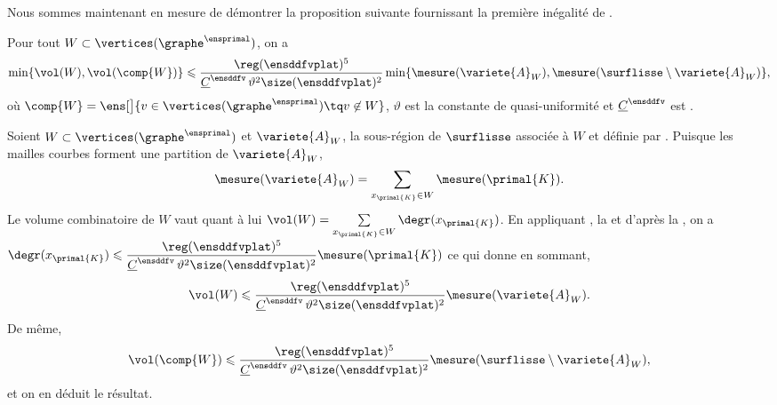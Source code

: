 Nous sommes maintenant en mesure de démontrer la proposition suivante fournissant la première inégalité de .
\begin{prop} \label{prop:inegalites_strategie_un}
Pour tout $W \subset \vertices(\graphe^\ensprimal)$, on a
\[
\min\{ \vol(W), \vol(\comp{W}) \} \leqslant \frac{\reg(\ensddfvplat)^5}{\underline{C}^\ensddfv \, \vartheta^2 \size(\ensddfvplat)^2} \min\{ \mesure(\variete{A}_W), \mesure(\surflisse \setminus \variete{A}_W) \},
\]
où $\comp{W} = \ens[\big]{v \in \vertices(\graphe^\ensprimal) \tq v \not\in W}$, $\vartheta$ est la constante de quasi-uniformité et $\underline{C}^\ensddfv$ est .
\end{prop}
\begin{demo}
Soient $W \subset \vertices(\graphe^\ensprimal)$ et $\variete{A}_W$, la sous-région de $\surflisse$ associée à $W$ et définie par . Puisque les mailles courbes forment une partition de $\variete{A}_W$,
\[
\mesure(\variete{A}_W) = \sum_{x_{\primal{K}} \in W} \mesure(\primal{K}).
\]
Le volume combinatoire de $W$ vaut quant à lui $\vol(W) = \sum\limits_{x_{\primal{K}} \in W} \degr(x_{\primal{K}})$. En appliquant , la  et d'après la , on a $\degr(x_{\primal{K}}) \leqslant \displaystyle\frac{\reg(\ensddfvplat)^5}{\underline{C}^\ensddfv \, \vartheta^2 \size(\ensddfvplat)^2} \mesure(\primal{K})$ ce qui donne en sommant, 
\[
\vol(W) \leqslant \frac{\reg(\ensddfvplat)^5}{\underline{C}^\ensddfv \, \vartheta^2 \size(\ensddfvplat)^2} \mesure(\variete{A}_W).
\]
De même,
\[
\vol(\comp{W}) \leqslant \frac{\reg(\ensddfvplat)^5}{\underline{C}^\ensddfv \, \vartheta^2 \size(\ensddfvplat)^2} \mesure(\surflisse \setminus \variete{A}_W),
\]
et on en déduit le résultat.
\end{demo}

